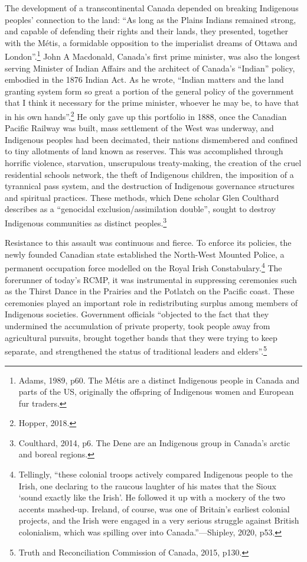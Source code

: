 The development of a transcontinental Canada depended on breaking Indigenous peoples' connection to the land: ``As long as the Plains Indians remained strong, and capable of defending their rights and their lands, they presented, together with the M\'{e}tis, a formidable opposition to the imperialist dreams of Ottawa and London''.\footnote{Adams, 1989, p60. The M\'{e}tis are a distinct Indigenous people in Canada and parts of the US, originally the offspring of Indigenous women and European fur traders.} John A Macdonald, Canada's first prime minister, was also the longest serving Minister of Indian Affairs and the architect of Canada's ``Indian'' policy, embodied in the 1876 Indian Act. As he wrote, ``Indian matters and the land granting system form so great a portion of the general policy of the government that I think it necessary for the prime minister, whoever he may be, to have that in his own hands''.\footnote{Hopper, 2018.} He only gave up this portfolio in 1888, once the Canadian Pacific Railway was built, mass settlement of the West was underway, and Indigenous peoples had been decimated, their nations dismembered and confined to tiny allotments of land known as reserves. This was accomplished through horrific violence, starvation, unscrupulous treaty-making, the creation of the cruel residential schools network, the theft of Indigenous children, the imposition of a tyrannical pass system, and the destruction of Indigenous governance structures and spiritual practices. These methods, which Dene scholar Glen Coulthard describes as a ``genocidal exclusion/assimilation double'', sought to destroy Indigenous communities as distinct peoples.\footnote{Coulthard, 2014, p6. The Dene are an Indigenous group in Canada's arctic and boreal regions.}

Resistance to this assault was continuous and fierce. To enforce its policies, the newly founded Canadian state established the North-West Mounted Police, a permanent occupation force modelled on the Royal Irish Constabulary.\footnote{Tellingly, ``these colonial troops actively compared Indigenous people to the Irish, one declaring to the raucous laughter of his mates that the Sioux `sound exactly like the Irish'. He followed it up with a mockery of the two accents mashed-up. Ireland, of course, was one of Britain's earliest colonial projects, and the Irish were engaged in a very serious struggle against British colonialism, which was spilling over into Canada.''---Shipley, 2020, p53.} The forerunner of today's RCMP, it was instrumental in suppressing ceremonies such as the Thirst Dance in the Prairies and the Potlatch on the Pacific coast. These ceremonies played an important role in redistributing surplus among members of Indigenous societies. Government officials ``objected to the fact that they undermined the accumulation of private property, took people away from agricultural pursuits, brought together bands that they were trying to keep separate, and strengthened the status of traditional leaders and elders''.\footnote{Truth and Reconciliation Commission of Canada, 2015, p130.}

